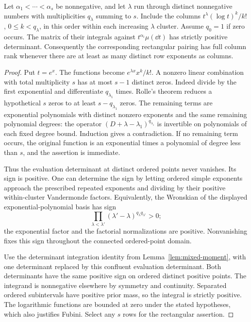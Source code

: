 \begin{lemma}\label{lem:confluent-positive}
Let $\alpha_1<\cdots<\alpha_s$ be nonnegative, and let $\lambda$ run
through distinct nonnegative numbers with multiplicities $q_\lambda$
summing to $s$. Include the columns
$t^\lambda(\log t)^k/k!$, $0\le k<q_\lambda$, in this order within
each increasing $\lambda$ cluster. Assume $q_0=1$ if zero occurs.
The matrix of their integrals against $t^{\alpha_i}\mu(\dd t)$ has
strictly positive determinant. Consequently the corresponding rectangular
pairing has full column rank whenever there are at least as many distinct
row exponents as columns.
\end{lemma}
\begin{proof}
Put $t=e^x$. The functions become $e^{\lambda x}x^k/k!$.
A nonzero linear combination with total multiplicity $s$ has at most
$s-1$ distinct zeros. Indeed divide by the first exponential and
differentiate $q_{\lambda_1}$ times. Rolle's theorem reduces a hypothetical
$s$ zeros to at least $s-q_{\lambda_1}$ zeros. The remaining terms are
exponential polynomials with distinct nonzero exponents and the same
remaining polynomial degrees: the operator $(D+\lambda-\lambda_1)^{q_{\lambda_1}}$
is invertible on polynomials of each fixed degree bound. Induction gives
a contradiction. If no remaining term occurs, the original function is
an exponential times a polynomial of degree less than $s$, and the
assertion is immediate.

Thus the evaluation determinant at distinct ordered points never
vanishes. Its sign is positive. One can determine the sign by letting
ordered simple exponents approach the prescribed repeated exponents and
dividing by their positive within-cluster Vandermonde factors. Equivalently,
the Wronskian of the displayed exponential-polynomial basis has sign
\[
 \prod_{\lambda<\lambda'}(\lambda'-\lambda)^{q_\lambda q_{\lambda'}}>0;
\]
the exponential factor and the factorial normalizations are positive.
Nonvanishing fixes this sign throughout the connected ordered-point domain.

Use the determinant integration identity from
Lemma~\ref{lem:mixed-moment}, with one determinant replaced by this
confluent evaluation determinant. Both determinants have the same positive
sign on ordered distinct positive points. The integrand is nonnegative
elsewhere by symmetry and continuity. Separated ordered subintervals have
positive prior mass, so the integral is strictly positive. The logarithmic
functions are bounded at zero under the stated hypotheses, which also
justifies Fubini. Select any $s$ rows for the rectangular assertion.
\end{proof}

